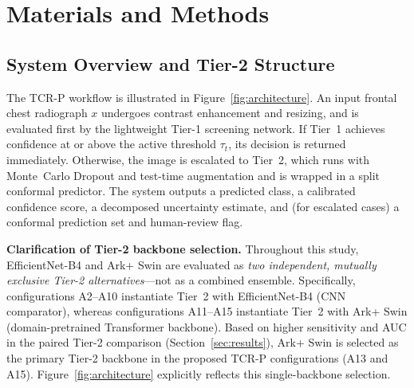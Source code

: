 \documentclass[diagnostics,article,submit,moreauthors]{Definitions/mdpi}
\newcommand{\rev}[1]{#1}
\begin{document}
\section{Materials and Methods}
\label{sec:methods}

\subsection{System Overview and Tier-2 Structure}

The TCR-P workflow is illustrated in Figure~\ref{fig:architecture}. An input frontal chest radiograph $x$ undergoes contrast enhancement and resizing, and is evaluated first by the lightweight Tier-1 screening network. If Tier~1 achieves confidence at or above the active threshold $\tau_t$, its decision is returned immediately. Otherwise, the image is escalated to Tier~2, which runs with Monte~Carlo Dropout and test-time augmentation and is wrapped in a split conformal predictor. The system outputs a predicted class, a calibrated confidence score, a decomposed uncertainty estimate, and (for escalated cases) a conformal prediction set and human-review flag.

\rev{\textbf{Clarification of Tier-2 backbone selection.} Throughout this study, EfficientNet-B4 and Ark+ Swin are evaluated as \emph{two independent, mutually exclusive Tier-2 alternatives}---not as a combined ensemble. Specifically, configurations A2--A10 instantiate Tier~2 with EfficientNet-B4 (CNN comparator), whereas configurations A11--A15 instantiate Tier~2 with Ark+ Swin (domain-pretrained Transformer backbone). Based on higher sensitivity and AUC in the paired Tier-2 comparison (Section~\ref{sec:results}), Ark+ Swin is selected as the primary Tier-2 backbone in the proposed TCR-P configurations (A13 and A15). Figure~\ref{fig:architecture} explicitly reflects this single-backbone selection.}
\end{document}
